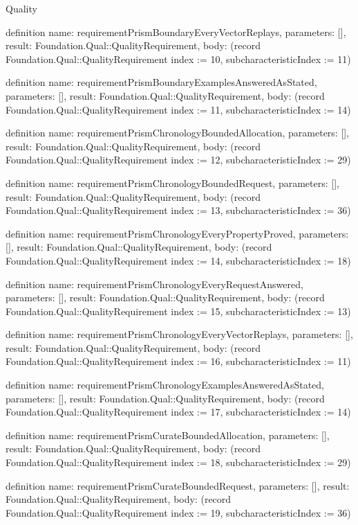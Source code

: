 \begin{lexlean}{Quality}
\begin{semanticmodule}
definition{
  name: requirementPrismBoundaryEveryVectorReplays,
  parameters: [],
  result: Foundation.Qual::QualityRequirement,
  body: (record Foundation.Qual::QualityRequirement {index := 10, subcharacteristicIndex := 11})
}

definition{
  name: requirementPrismBoundaryExamplesAnsweredAsStated,
  parameters: [],
  result: Foundation.Qual::QualityRequirement,
  body: (record Foundation.Qual::QualityRequirement {index := 11, subcharacteristicIndex := 14})
}

definition{
  name: requirementPrismChronologyBoundedAllocation,
  parameters: [],
  result: Foundation.Qual::QualityRequirement,
  body: (record Foundation.Qual::QualityRequirement {index := 12, subcharacteristicIndex := 29})
}

definition{
  name: requirementPrismChronologyBoundedRequest,
  parameters: [],
  result: Foundation.Qual::QualityRequirement,
  body: (record Foundation.Qual::QualityRequirement {index := 13, subcharacteristicIndex := 36})
}

definition{
  name: requirementPrismChronologyEveryPropertyProved,
  parameters: [],
  result: Foundation.Qual::QualityRequirement,
  body: (record Foundation.Qual::QualityRequirement {index := 14, subcharacteristicIndex := 18})
}

definition{
  name: requirementPrismChronologyEveryRequestAnswered,
  parameters: [],
  result: Foundation.Qual::QualityRequirement,
  body: (record Foundation.Qual::QualityRequirement {index := 15, subcharacteristicIndex := 13})
}

definition{
  name: requirementPrismChronologyEveryVectorReplays,
  parameters: [],
  result: Foundation.Qual::QualityRequirement,
  body: (record Foundation.Qual::QualityRequirement {index := 16, subcharacteristicIndex := 11})
}

definition{
  name: requirementPrismChronologyExamplesAnsweredAsStated,
  parameters: [],
  result: Foundation.Qual::QualityRequirement,
  body: (record Foundation.Qual::QualityRequirement {index := 17, subcharacteristicIndex := 14})
}

definition{
  name: requirementPrismCurateBoundedAllocation,
  parameters: [],
  result: Foundation.Qual::QualityRequirement,
  body: (record Foundation.Qual::QualityRequirement {index := 18, subcharacteristicIndex := 29})
}

definition{
  name: requirementPrismCurateBoundedRequest,
  parameters: [],
  result: Foundation.Qual::QualityRequirement,
  body: (record Foundation.Qual::QualityRequirement {index := 19, subcharacteristicIndex := 36})
}


\end{semanticmodule}
\end{lexlean}
